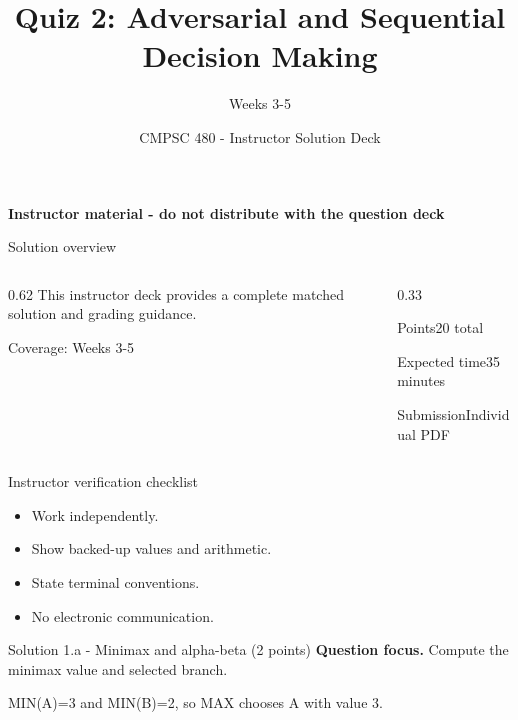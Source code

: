 \documentclass[aspectratio=169,11pt]{beamer}
\title[Quiz 2 Solutions]{Quiz 2: Adversarial and Sequential Decision Making}
\subtitle{Weeks 3-5}
\author{CMPSC 480 - Instructor Solution Deck}
\date{}
\begin{document}
\begin{frame}
  \titlepage
\vspace{-0.35cm}
\begin{center}
\color{coursered}\bfseries Instructor material - do not distribute with the question deck
\end{center}
\end{frame}

\begin{frame}{Solution overview}
\begin{columns}[T,onlytextwidth]
\begin{column}{0.62\textwidth}
\Large This instructor deck provides a complete matched solution and grading guidance.

\vspace{0.35cm}
\normalsize
Coverage: Weeks 3-5
\end{column}
\begin{column}{0.33\textwidth}
\begin{block}{Points}20 total\end{block}
\begin{block}{Expected time}35 minutes\end{block}
\begin{block}{Submission}Individual PDF\end{block}
\end{column}
\end{columns}
\end{frame}

\begin{frame}{Instructor verification checklist}
\small
\begin{itemize}
  \item Work independently.
  \item Show backed-up values and arithmetic.
  \item State terminal conventions.
  \item No electronic communication.
\end{itemize}
\end{frame}

\begin{frame}{Solution 1.a - Minimax and alpha-beta (2 points)}
\small
\textbf{Question focus.} Compute the minimax value and selected branch.

\vspace{0.25cm}
\answerlabel MIN(A)=3 and MIN(B)=2, so MAX chooses A with value 3.
\end{frame}
\end{document}
